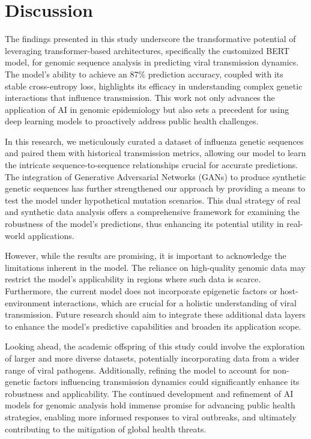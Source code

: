 \documentclass{article}
\begin{document}
\section{Discussion}
The findings presented in this study underscore the transformative potential of leveraging transformer-based architectures, specifically the customized BERT model, for genomic sequence analysis in predicting viral transmission dynamics. The model's ability to achieve an 87\% prediction accuracy, coupled with its stable cross-entropy loss, highlights its efficacy in understanding complex genetic interactions that influence transmission. This work not only advances the application of AI in genomic epidemiology but also sets a precedent for using deep learning models to proactively address public health challenges.

In this research, we meticulously curated a dataset of influenza genetic sequences and paired them with historical transmission metrics, allowing our model to learn the intricate sequence-to-sequence relationships crucial for accurate predictions. The integration of Generative Adversarial Networks (GANs) to produce synthetic genetic sequences has further strengthened our approach by providing a means to test the model under hypothetical mutation scenarios. This dual strategy of real and synthetic data analysis offers a comprehensive framework for examining the robustness of the model's predictions, thus enhancing its potential utility in real-world applications.

However, while the results are promising, it is important to acknowledge the limitations inherent in the model. The reliance on high-quality genomic data may restrict the model's applicability in regions where such data is scarce. Furthermore, the current model does not incorporate epigenetic factors or host-environment interactions, which are crucial for a holistic understanding of viral transmission. Future research should aim to integrate these additional data layers to enhance the model's predictive capabilities and broaden its application scope.

Looking ahead, the academic offspring of this study could involve the exploration of larger and more diverse datasets, potentially incorporating data from a wider range of viral pathogens. Additionally, refining the model to account for non-genetic factors influencing transmission dynamics could significantly enhance its robustness and applicability. The continued development and refinement of AI models for genomic analysis hold immense promise for advancing public health strategies, enabling more informed responses to viral outbreaks, and ultimately contributing to the mitigation of global health threats.
\end{document}
